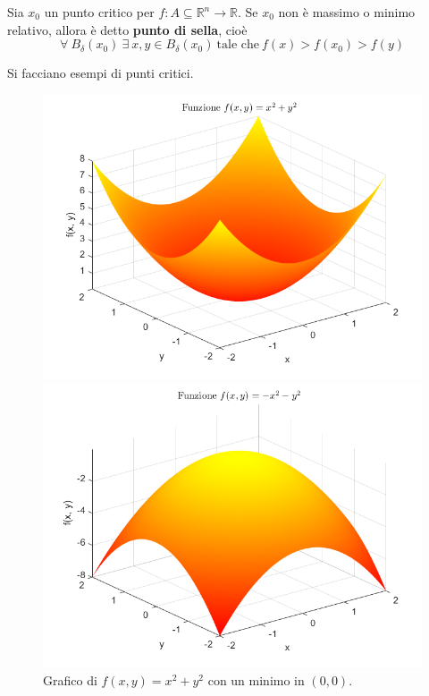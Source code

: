\begin{definition} \label{Def: Punto di sella}
    Sia $x_0$ un punto critico per $f:A \subseteq \mathbb{R}^n \to \mathbb{R}$. Se $x_0$ non è massimo o minimo relativo, allora è detto \textbf{punto di sella}, cioè
    \begin{equation}
        \forall\ B_\delta(x_0)\ \exists\ x,y \in B_\delta(x_0)\ \text{tale che}\ f(x)>f(x_0)>f(y)
    \end{equation} 
\end{definition}
\begin{example}
    Si facciano esempi di punti critici.
    \begin{figure}[H]
        \centering
        \begin{minipage}{0.26\textwidth}
            \centering
            \includegraphics[width=\textwidth]{Capitoli/Capitolo2/B_Punti critici 1.png}
            \caption{Grafico di $f(x,y)=x^2+y^2$ con un minimo in $(0,0)$.}
        \end{minipage}
        \hspace{1cm}
        \begin{minipage}{0.26\textwidth}
            \centering
            \includegraphics[width=\textwidth]{Capitoli/Capitolo2/B_Punti critici 2.png}

\end{minipage}
\end{figure}
\end{example}
